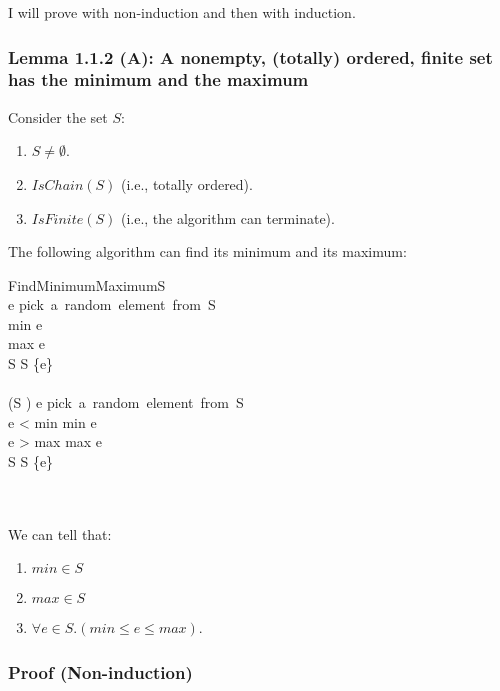 \documentclass[12pt, letterpaper, oneside]{book}
\begin{document}
I will prove with non-induction and then with induction.

\subsubsection{Lemma 1.1.2 (A): A nonempty, (totally) ordered, finite set has the minimum and the maximum}

Consider the set $S$:
\begin{enumerate}
  \item $S \ne \emptyset$.
  \item $IsChain(S)$ (i.e., totally ordered).
  \item $IsFinite(S)$ (i.e., the algorithm can terminate).
\end{enumerate}

The following algorithm can find its minimum and its maximum:

\begin{pseudocode}[ruled]{FindMinimumMaximum}{S}
   \\
  e \GETS \mbox{pick a random element from S} \\
  min \GETS e \\
  max \GETS e \\
  S \GETS S \setminus \{e\} \\
  \\
  \WHILE (S \ne \emptyset) \DO
  \BEGIN
  e \GETS \mbox{pick a random element from S} \\
  \IF e < min \THEN min \GETS e \\
  \IF e > max \THEN max \GETS e \\
  S \GETS S \setminus \{e\} \\
  \END \\
  \\
\end{pseudocode}

We can tell that:
\begin{enumerate}
  \item $min \in S$
  \item $max \in S$
  \item $\forall e \in S. (min \leqslant e \leqslant max)$.
\end{enumerate}

\subsubsection{Proof (Non-induction)}
\end{document}
